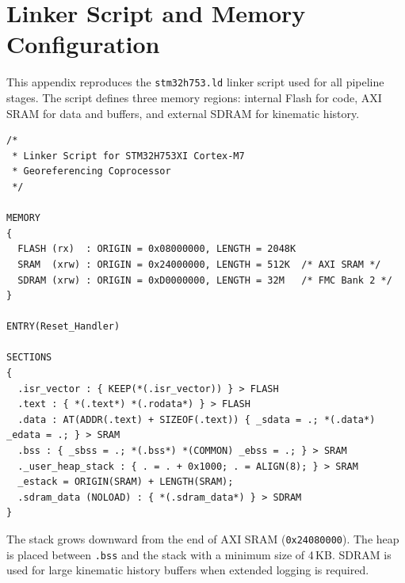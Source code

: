 \chapter{Linker Script and Memory Configuration}
\label{app:B}

This appendix reproduces the \texttt{stm32h753.ld} linker script used for all pipeline stages. The script defines three memory regions: internal Flash for code, AXI SRAM for data and buffers, and external SDRAM for kinematic history.

\begin{lstlisting}[style=plainstyle]
/*
 * Linker Script for STM32H753XI Cortex-M7
 * Georeferencing Coprocessor
 */

MEMORY
{
  FLASH (rx)  : ORIGIN = 0x08000000, LENGTH = 2048K
  SRAM  (xrw) : ORIGIN = 0x24000000, LENGTH = 512K  /* AXI SRAM */
  SDRAM (xrw) : ORIGIN = 0xD0000000, LENGTH = 32M   /* FMC Bank 2 */
}

ENTRY(Reset_Handler)

SECTIONS
{
  .isr_vector : { KEEP(*(.isr_vector)) } > FLASH
  .text : { *(.text*) *(.rodata*) } > FLASH
  .data : AT(ADDR(.text) + SIZEOF(.text)) { _sdata = .; *(.data*) _edata = .; } > SRAM
  .bss : { _sbss = .; *(.bss*) *(COMMON) _ebss = .; } > SRAM
  ._user_heap_stack : { . = . + 0x1000; . = ALIGN(8); } > SRAM
  _estack = ORIGIN(SRAM) + LENGTH(SRAM);
  .sdram_data (NOLOAD) : { *(.sdram_data*) } > SDRAM
}
\end{lstlisting}

The stack grows downward from the end of AXI SRAM (\texttt{0x24080000}). The heap is placed between \texttt{.bss} and the stack with a minimum size of 4\,KB. SDRAM is used for large kinematic history buffers when extended logging is required.